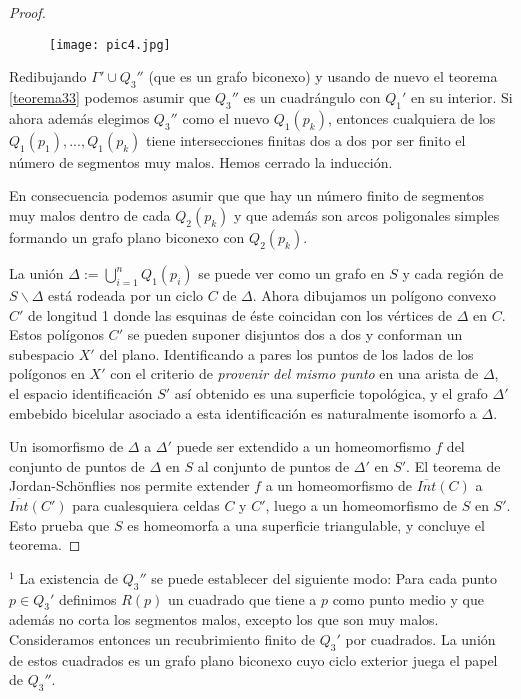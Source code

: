 \begin{proof}
\begin{figure}[h]
\centering
\begin{minipage}[c]{\textwidth}
\centering
    \texttt{[image: pic4.jpg]}
\end{minipage}
\end{figure}
	
	Redibujando $\Gamma' \cup Q_{3}''$	(que es un grafo biconexo) y usando de nuevo el teorema \ref{teorema33} podemos asumir  que $Q_{3}''$ es un cuadrángulo con $Q_{1}'$ en su interior. Si ahora además elegimos $Q_{3}''$ como el nuevo $Q_{1}(p_k)$, entonces cualquiera de los $Q_{1}(p_1),..., Q_{1}(p_k)$ tiene intersecciones finitas dos a dos por ser finito el número de segmentos muy malos. Hemos cerrado la inducción.
 
	En consecuencia podemos asumir que que hay un número finito de segmentos muy malos dentro de cada $Q_{2}(p_k)$ y que además son arcos poligonales simples formando un grafo plano biconexo con $Q_{2}(p_k)$.

	La unión $\Delta:=\bigcup_{i = 1}^{n} Q_{1}(p_i)$ se puede ver como un grafo  en $S$ y cada región de $S \backslash \Delta$ está rodeada por un ciclo $C$ de $\Delta$. Ahora dibujamos un polígono convexo $C'$ de longitud 1 donde las esquinas de éste coincidan con los vértices de $\Delta$ en  $C$. Estos polígonos $C'$ se pueden suponer disjuntos dos a dos y conforman un subespacio $X'$ del plano. Identificando a pares los puntos de los lados de los polígonos en $X'$ con el criterio de {\em provenir del mismo punto} en una  arista de $\Delta$, el espacio identificación  $S'$ así obtenido es una superficie topológica, y el  grafo $\Delta'$ embebido bicelular asociado a esta identificación es naturalmente isomorfo a $\Delta$.

	Un isomorfismo de $\Delta$ a $\Delta'$ puede ser extendido a un homeomorfismo $f$ del conjunto de puntos de $\Delta$ en $S$ al conjunto de puntos de $\Delta'$ en $S'$. El teorema de Jordan-Schönflies nos permite extender $f$   a un homeomorfismo de $\overline{Int}(C)$ a $\overline{Int}(C')$ para cualesquiera celdas $C$ y $C'$, luego a un homeomorfismo de $S$ en $S'$. Esto prueba que $S$ es homeomorfa a una superficie triangulable, y concluye el teorema.
\end{proof}

	$^{1}$ La existencia de $Q_{3}''$ se puede establecer del siguiente modo: Para cada punto $p \in Q_{3}'$ definimos $R(p)$ un cuadrado que tiene a $p$ como punto medio y que además no corta los segmentos malos, excepto los que son muy malos. Consideramos entonces un recubrimiento finito de $Q_{3}'$ por cuadrados. La unión de estos cuadrados es un grafo plano biconexo cuyo ciclo exterior juega el papel de $Q_{3}''$.


